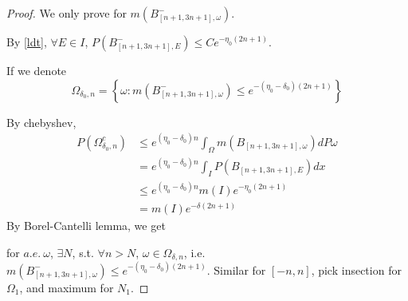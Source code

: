 \begin{proof}
  We only prove for $m(B_{[n+1,3n+1],\omega}^-)$.

  By \eqref{ldt}, $\forall E\in I$, $P(B_{[n+1,3n+1],E}^-)\leq Ce^{-\eta_0(2n+1)}$.

  If we denote
    \[
      \Omega_{\delta_0,n}=\left\{\omega:m(B_{[n+1,3n+1],\omega}^-)\leq e^{-(\eta_0-\delta_0)(2n+1)}\right\}
    \]

  By chebyshev,
  \[
    \begin{aligned}
      P(\Omega_{\delta_0,n}^c)
      &\leq e^{(\eta_0-\delta_0)n}\int_{\Omega} m(B_{[n+1,3n+1],\omega})dP\omega\\
      &=    e^{(\eta_0-\delta_0)n}\int_I P(B_{[n+1,3n+1],E})dx\\
      &\leq e^{(\eta_0-\delta_0)n}m(I)e^{-\eta_0(2n+1)}\\
      &=m(I)e^{-\delta(2n+1)}
    \end{aligned}
  \]
By Borel-Cantelli lemma, we get

for $a.e.~\omega$, $\exists N$, s.t. $\forall n>N$, $\omega\in\Omega_{\delta,n}$, i.e. $m(B_{[n+1,3n+1],\omega}^-)\leq e^{-(\eta_0-\delta_0)(2n+1)}.$
Similar for $[-n,n]$, pick insection for $\Omega_1$, and maximum for $N_1$.
\end{proof}

